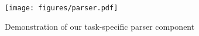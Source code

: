 \begin{figure}[t]
\centering
\texttt{[image: figures/parser.pdf]}
\caption{Demonstration of our task-specific parser component}
\label{parser_fig} 
\end{figure}
